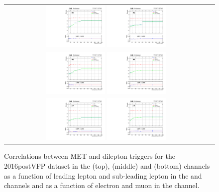 \begin{figure}[!htb]
  \begin{center}
    \begin{tabular}{cc}
      \includegraphics[width=0.30\textwidth]{fig_2016postVFP_TrigSF/g_lepApt_emu_alpha.pdf}
      \includegraphics[width=0.30\textwidth]{fig_2016postVFP_TrigSF/g_lepBpt_emu_alpha.pdf}\\
      \includegraphics[width=0.30\textwidth]{fig_2016postVFP_TrigSF/g_lepApt_ee_alpha.pdf}
      \includegraphics[width=0.30\textwidth]{fig_2016postVFP_TrigSF/g_lepBpt_ee_alpha.pdf}\\
      \includegraphics[width=0.30\textwidth]{fig_2016postVFP_TrigSF/g_lepApt_mumu_alpha.pdf}
      \includegraphics[width=0.30\textwidth]{fig_2016postVFP_TrigSF/g_lepBpt_mumu_alpha.pdf}\\
    \end{tabular}
    \caption{Correlations between MET and dilepton triggers for the 2016postVFP dataset in the \emu (top), \ee (middle) and \mumu (bottom) channels as a function of leading lepton \pT and sub-leading lepton \pT in the \ee and \mumu channels and as a function of electron \pT and muon \pT in the \emu channel.}
    \label{TrigSF_2016postVFP_5}
  \end{center}
\end{figure}


